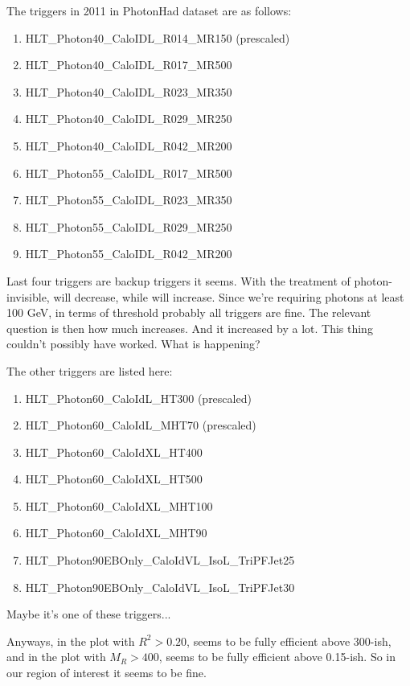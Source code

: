 The triggers in 2011 in PhotonHad dataset are as follows:
\begin{enumerate}
\item HLT\_Photon40\_CaloIDL\_R014\_MR150 (prescaled)
\item HLT\_Photon40\_CaloIDL\_R017\_MR500
\item HLT\_Photon40\_CaloIDL\_R023\_MR350
\item HLT\_Photon40\_CaloIDL\_R029\_MR250
\item HLT\_Photon40\_CaloIDL\_R042\_MR200
\item HLT\_Photon55\_CaloIDL\_R017\_MR500
\item HLT\_Photon55\_CaloIDL\_R023\_MR350
\item HLT\_Photon55\_CaloIDL\_R029\_MR250
\item HLT\_Photon55\_CaloIDL\_R042\_MR200
\end{enumerate}
Last four triggers are backup triggers it seems.  With the treatment of photon-invisible,
\MR will decrease, while \R will increase.  Since we're requiring photons at least 100 GeV,
in terms of \MR threshold probably all triggers are fine.  The relevant question is then how
much \R increases.  And it increased by a lot.  This thing couldn't possibly have worked.
What is happening?

The other triggers are listed here:
\begin{enumerate}
\item HLT\_Photon60\_CaloIdL\_HT300 (prescaled)
\item HLT\_Photon60\_CaloIdL\_MHT70 (prescaled)
\item HLT\_Photon60\_CaloIdXL\_HT400
\item HLT\_Photon60\_CaloIdXL\_HT500
\item HLT\_Photon60\_CaloIdXL\_MHT100
\item HLT\_Photon60\_CaloIdXL\_MHT90
\item HLT\_Photon90EBOnly\_CaloIdVL\_IsoL\_TriPFJet25
\item HLT\_Photon90EBOnly\_CaloIdVL\_IsoL\_TriPFJet30
\end{enumerate}
Maybe it's one of these triggers... \ActionItem

Anyways, in the plot with $R^2 > 0.20$, \MR seems to be fully efficient above 300-ish, and
in the plot with $M_R > 400$, \RSquare seems to be fully efficient above 0.15-ish.  So in our
region of interest it seems to be fine.





